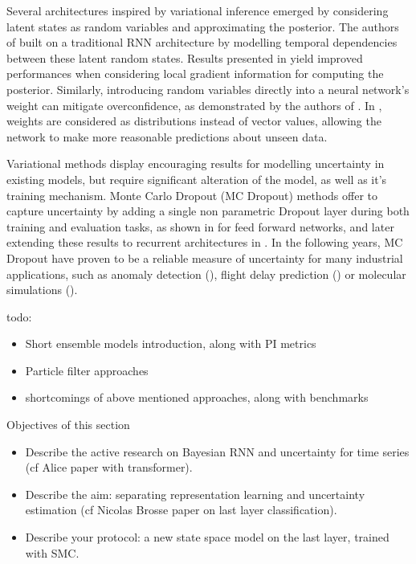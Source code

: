 \documentclass{article}
\begin{document}
Several architectures inspired by variational inference emerged by considering latent states as random variables and approximating the posterior.
The authors of \cite{Chung2015NIPS} built on a traditional RNN architecture by modelling temporal dependencies between these latent random states.
Results presented in \cite{Fortunato2017bayesian} yield improved performances when considering local gradient information for computing the posterior.
Similarly, introducing random variables directly into a neural network's weight can mitigate overconfidence, as demonstrated by the authors of \cite{Hinton1993}.
In \cite{Blundell2015}, weights are considered as distributions instead of vector values, allowing the network to make more reasonable predictions about unseen data.

Variational methods display encouraging results for modelling uncertainty in existing models, but require significant alteration of the model, as well as it's training mechanism.
Monte Carlo Dropout (MC Dropout) methods offer to capture uncertainty by adding a single non parametric Dropout layer during both training and evaluation tasks, as shown in \cite{Gal2016} for	feed forward networks, and later extending these results to recurrent architectures in \cite{Gal2016NIPS}.
In the following years, MC Dropout have proven to be a reliable measure of uncertainty for many industrial applications, such as anomaly detection (\cite{Zhu2017DeepAC}), flight delay prediction (\cite{Vandal2018}) or molecular simulations (\cite{Wen2020UncertaintyQI}).

todo:
\begin{itemize}
	\item Short ensemble models introduction, along with PI metrics
	\item Particle filter approaches
	\item shortcomings of above mentioned approaches, along with benchmarks
\end{itemize}


Objectives of this section
\begin{itemize}
	\item Describe the active research on Bayesian RNN and uncertainty for time series (cf Alice paper with transformer).
	\item Describe the aim: separating  representation learning and uncertainty estimation (cf Nicolas Brosse paper on last layer classification).
	\item Describe your protocol: a new state space model on the last layer, trained with SMC.
\end{itemize}
\end{document}
